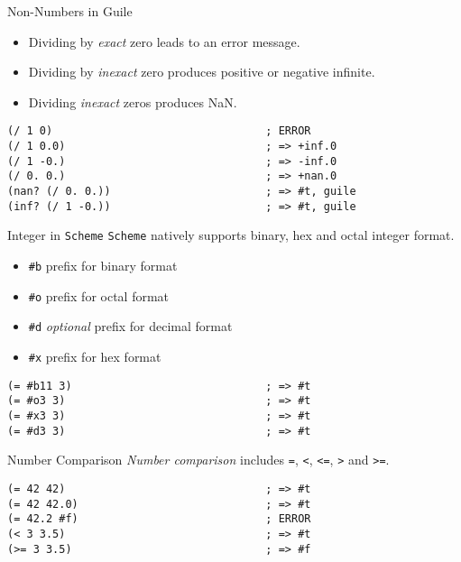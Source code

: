 \documentclass[presentation]{beamer}
\begin{document}
\begin{frame}[fragile,label={sec:orgheadline14}]{Non-Numbers in Guile}
 \begin{itemize}
\item Dividing by \emph{exact} zero leads to an error message.
\item Dividing by \emph{inexact} zero produces positive or negative
infinite.
\item Dividing \emph{inexact} zeros produces NaN.
\end{itemize}

\begin{verbatim}
(/ 1 0)                                 ; ERROR
(/ 1 0.0)                               ; => +inf.0
(/ 1 -0.)                               ; => -inf.0
(/ 0. 0.)                               ; => +nan.0
(nan? (/ 0. 0.))                        ; => #t, guile
(inf? (/ 1 -0.))                        ; => #t, guile
\end{verbatim}
\end{frame}

\begin{frame}[fragile,label={sec:orgheadline15}]{Integer in \texttt{Scheme}}
 \texttt{Scheme} natively supports binary, hex and octal integer format.

\begin{itemize}
\item \texttt{\#b} prefix for binary format
\item \texttt{\#o} prefix for octal format
\item \texttt{\#d} \emph{optional} prefix for decimal format
\item \texttt{\#x} prefix for hex format
\end{itemize}

\begin{verbatim}
(= #b11 3)                              ; => #t
(= #o3 3)                               ; => #t
(= #x3 3)                               ; => #t
(= #d3 3)                               ; => #t
\end{verbatim}
\end{frame}

\begin{frame}[fragile,label={sec:orgheadline16}]{Number Comparison}
 \emph{Number comparison} includes \texttt{=}, \texttt{<}, \texttt{<=}, \texttt{>} and \texttt{>=}.

\begin{verbatim}
(= 42 42)                               ; => #t
(= 42 42.0)                             ; => #t
(= 42.2 #f)                             ; ERROR
(< 3 3.5)                               ; => #t
(>= 3 3.5)                              ; => #f
\end{verbatim}
\end{frame}
\end{document}
